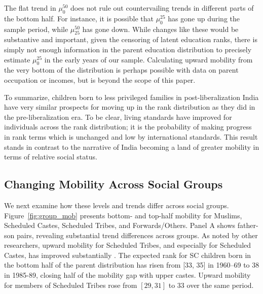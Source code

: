 \documentclass[12pt,letterpaper]{article}
\numberwithin{equation}{section}
\begin{document}
The flat trend in $\mu_0^{50}$ does not rule out countervailing trends in different parts of the bottom half. For instance, it is possible that $\mu_0^{25}$ has gone up during the sample period, while $\mu_{25}^{50}$ has gone down. While changes like these would be substantive and important, given the censoring of latent education ranks, there is simply not enough information in the parent education distribution to precisely estimate $\mu_0^{25}$ in the early years of our sample. Calculating upward mobility from the very bottom of the distribution is perhaps possible with data on parent occupation or incomes, but is beyond the scope of this paper.

To summarize, children born to less privileged families in post-liberalization India have very similar prospects for moving up in the rank distribution as they did in the pre-liberalization era. To be clear, living standards have improved for individuals across the rank distribution; it is the probability of making progress in rank terms which is unchanged and low by international standards.  This result stands in contrast to the narrative of India becoming a land of greater mobility in terms of relative social status.

\subsection{Changing Mobility Across Social Groups}
\label{sec:groups}

We next examine how these levels and trends differ across social groups.  Figure~\ref{fig:group_mob} presents bottom- and top-half mobility for Muslims, Scheduled Castes, Scheduled Tribes, and Forwards/Others. Panel A shows father-son pairs, revealing substantial trend differences across groups. As noted by other researchers, upward mobility for Scheduled Tribes, and especially for Scheduled Castes, has improved substantially \cite{hnatkovska2012,emran2015}. The expected rank for SC children born in the bottom half of the parent distribution has risen from [33, 35] in 1960--69 to 38 in 1985-89, closing half of the mobility gap with upper castes. Upward mobility for members of Scheduled Tribes rose from $[29,31]$ to 33 over the same period.
\end{document}
